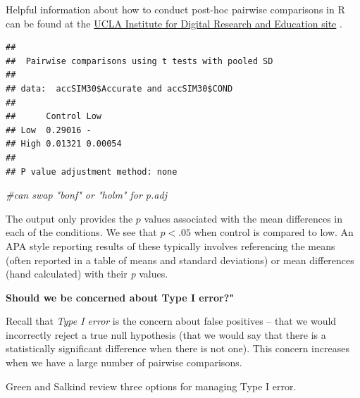 \documentclass[
  english,
]{book}
\newenvironment{Shaded}{\begin{snugshade}}{\end{snugshade}}
\newcommand{\AttributeTok}[1]{\textcolor[rgb]{0.77,0.63,0.00}{#1}}
\newcommand{\CommentTok}[1]{\textcolor[rgb]{0.56,0.35,0.01}{\textit{#1}}}
\newcommand{\FunctionTok}[1]{\textcolor[rgb]{0.00,0.00,0.00}{#1}}
\newcommand{\NormalTok}[1]{#1}
\newcommand{\SpecialCharTok}[1]{\textcolor[rgb]{0.00,0.00,0.00}{#1}}
\newcommand{\StringTok}[1]{\textcolor[rgb]{0.31,0.60,0.02}{#1}}
\begin{document}
Helpful information about how to conduct post-hoc pairwise comparisons in R can be found at the \href{https://stats.idre.ucla.edu/r/faq/how-can-i-do-post-hoc-pairwise-comparisons-in-r/}{UCLA Institute for Digital Research and Education site} \citep{noauthor_how_nodate}.

\begin{Shaded}
\end{Shaded}

\begin{verbatim}
## 
##  Pairwise comparisons using t tests with pooled SD 
## 
## data:  accSIM30$Accurate and accSIM30$COND 
## 
##      Control Low    
## Low  0.29016 -      
## High 0.01321 0.00054
## 
## P value adjustment method: none
\end{verbatim}

\begin{Shaded}
\begin{Highlighting}[]
\CommentTok{\#can swap "bonf" or "holm" for p.adj}
\end{Highlighting}
\end{Shaded}

The output only provides the \(p\) values associated with the mean differences in each of the conditions. We see that \(p < .05\) when control is compared to low. An APA style reporting results of these typically involves referencing the means (often reported in a table of means and standard deviations) or mean differences (hand calculated) with their \emph{p} values.

\textbf{Should we be concerned about Type I error?"}

Recall that \emph{Type I error} is the concern about false positives -- that we would incorrectly reject a true null hypothesis (that we would say that there is a statistically significant difference when there is not one). This concern increases when we have a large number of pairwise comparisons.

Green and Salkind \citeyearpar{green_using_2014} review three options for managing Type I error.
\end{document}
